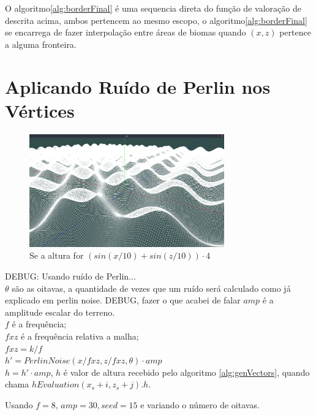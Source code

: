 O algoritmo\ref{alg:borderFinal} é uma sequencia direta do função de valoração de 
descrita acima, ambos pertencem ao mesmo escopo, o algoritmo\ref{alg:borderFinal}
se encarrega de fazer interpolação entre áreas de biomas quando $(x, z)$ pertence
a alguma fronteira.

\section{Aplicando Ruído de Perlin nos Vértices}


\begin{figure}[H]
    \centering
    \includegraphics[width=0.75\textwidth]{figuras/sssins.png}
    \caption{Se a altura for $(sin(x/10) + sin(z/10)) \cdot 4$}
    \label{fig:sssins}
\end{figure}

DEBUG: Usando ruído de Perlin...\\
$\theta$ são as oitavas, a quantidade de vezes que um ruído será calculado 
como já explicado em perlin noise. DEBUG, fazer o que acabei de falar
$amp$ é a amplitude escalar do terreno.\\
$f$ é a frequência;\\
$fxz$ é a frequência relativa a malha;\\
$fxz = k/f$\\
$h' = PerlinNoise(x/fxz, z/fxz, \theta) \cdot amp$\\
$h = h' \cdot amp$, $h$ é valor de altura recebido pelo algoritmo \ref{alg:genVectors}, quando chama $hEvaluation(x_{s} + i, z_{s} + j).h$.

Usando $f = 8$, $amp = 30, seed = 15$ e variando o número de oitavas.

